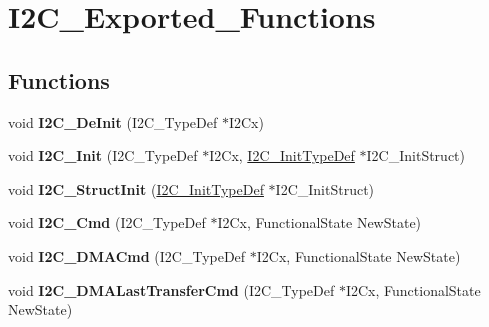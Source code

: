 \hypertarget{group__I2C__Exported__Functions}{
\section{I2C\_\-Exported\_\-Functions}
\label{group__I2C__Exported__Functions}
}
\subsection*{Functions}
\begin{DoxyCompactItemize}
\item 
\hypertarget{group__I2C__Exported__Functions_ga2ee214364603059ad5d9089f749f5bfd}{
void {\bfseries I2C\_\-DeInit} (I2C\_\-TypeDef $\ast$I2Cx)}
\label{group__I2C__Exported__Functions_ga2ee214364603059ad5d9089f749f5bfd}

\item 
\hypertarget{group__I2C__Exported__Functions_gaac29465bca70fbc91c2f922ab67bb88e}{
void {\bfseries I2C\_\-Init} (I2C\_\-TypeDef $\ast$I2Cx, \hyperlink{structI2C__InitTypeDef}{I2C\_\-InitTypeDef} $\ast$I2C\_\-InitStruct)}
\label{group__I2C__Exported__Functions_gaac29465bca70fbc91c2f922ab67bb88e}

\item 
\hypertarget{group__I2C__Exported__Functions_ga08582aca6d7d7910cd5cbff0d9def350}{
void {\bfseries I2C\_\-StructInit} (\hyperlink{structI2C__InitTypeDef}{I2C\_\-InitTypeDef} $\ast$I2C\_\-InitStruct)}
\label{group__I2C__Exported__Functions_ga08582aca6d7d7910cd5cbff0d9def350}

\item 
\hypertarget{group__I2C__Exported__Functions_ga7e1323c9133c2cb424dfb5b10b7d2f0b}{
void {\bfseries I2C\_\-Cmd} (I2C\_\-TypeDef $\ast$I2Cx, FunctionalState NewState)}
\label{group__I2C__Exported__Functions_ga7e1323c9133c2cb424dfb5b10b7d2f0b}

\item 
\hypertarget{group__I2C__Exported__Functions_ga38502ce11e5ec923e0f6476aaa35b45c}{
void {\bfseries I2C\_\-DMACmd} (I2C\_\-TypeDef $\ast$I2Cx, FunctionalState NewState)}
\label{group__I2C__Exported__Functions_ga38502ce11e5ec923e0f6476aaa35b45c}

\item 
\hypertarget{group__I2C__Exported__Functions_gab2e994c5681eb6ec7c26a03ffe1de060}{
void {\bfseries I2C\_\-DMALastTransferCmd} (I2C\_\-TypeDef $\ast$I2Cx, FunctionalState NewState)}
\label{group__I2C__Exported__Functions_gab2e994c5681eb6ec7c26a03ffe1de060}


\end{DoxyCompactItemize}

